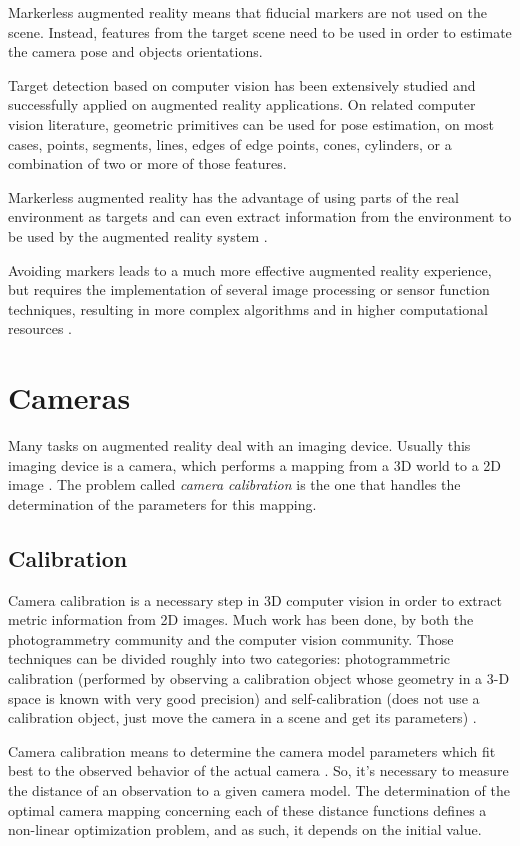 \documentclass[msc, a4paper, classic, en]{ufbathesis}
\begin{document}
Markerless augmented reality means that fiducial markers are not used on the scene. Instead, features from the target scene need to be used in order to estimate the camera pose and objects orientations.

Target detection based on computer vision has been extensively studied and successfully applied on augmented reality applications. On related computer vision literature, geometric primitives can be used for pose estimation, on most cases, points, segments, lines, edges of edge points, cones, cylinders, or a combination of two or more of those features.

Markerless augmented reality has the advantage of using parts of the real environment as targets and can even extract information from the environment to be used by the augmented reality system \cite{dolz}.

Avoiding markers leads to a much more effective augmented reality experience, but requires the implementation of several image processing or sensor function techniques, resulting in more complex algorithms and in higher computational resources \cite{shumaker2011virtual}.

\section{Cameras}

Many tasks on augmented reality deal with an imaging device. Usually this imaging device is a camera, which performs a mapping from a 3D world to a 2D image \cite{hanning2011high}. The problem called \textit{camera calibration} is the one that handles the determination of the parameters for this mapping.

\subsection{Calibration}

Camera calibration is a necessary step in 3D computer vision in order to extract metric information from 2D images. Much work has been done, by both the photogrammetry community and the computer vision community. Those techniques can be divided roughly into two categories: photogrammetric calibration (performed by observing a calibration object whose geometry in a 3-D space is known with very good precision) and self-calibration (does not use a calibration object, just move the camera in a scene and get its parameters) \cite{zhang2000flexible}.

Camera calibration means to determine the camera model parameters which fit best to the observed behavior of the actual camera \cite{hanning2011high}. So, it's necessary to measure the distance of an observation to a given camera model. The determination of the optimal camera mapping concerning each of these distance functions defines a non-linear optimization problem, and as such, it depends on the initial value.
\end{document}
